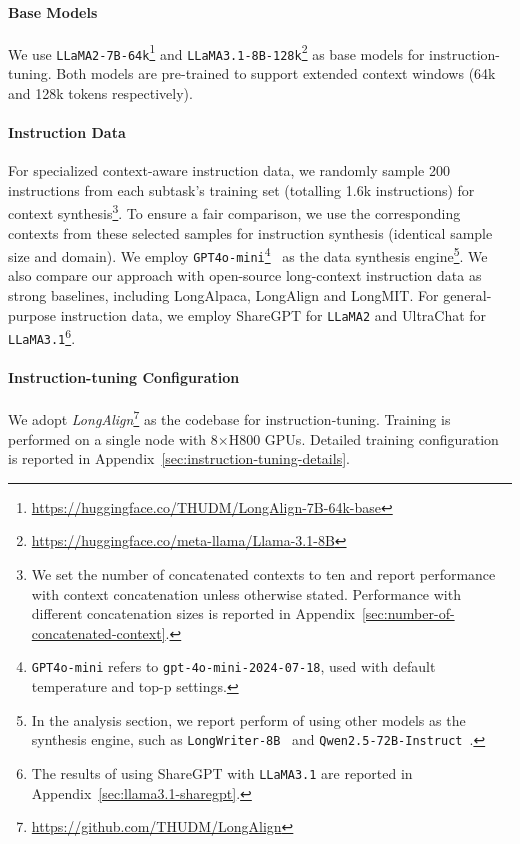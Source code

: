 \noindent\paragraph{Base Models}
We use \texttt{LLaMA2-7B-64k}\footnote{\url{https://huggingface.co/THUDM/LongAlign-7B-64k-base}}
and \texttt{LLaMA3.1-8B-128k}\footnote{\url{https://huggingface.co/meta-llama/Llama-3.1-8B}} as base models for instruction-tuning.
Both models are pre-trained to support extended context windows (64k and 128k tokens respectively).

\noindent\paragraph{Instruction Data}
For specialized context-aware instruction data, we randomly sample 200 instructions from each subtask's training set (totalling 1.6k instructions) for context synthesis\footnote{We set the number of concatenated contexts to ten and report performance with context concatenation unless otherwise stated. Performance with different concatenation sizes is reported in Appendix~\ref{sec:number-of-concatenated-context}.}.
To ensure a fair comparison, we use the corresponding contexts from these selected samples for instruction synthesis (identical sample size and domain).
We employ \texttt{GPT4o-mini}\footnote{\texttt{GPT4o-mini} refers to \texttt{gpt-4o-mini-2024-07-18}, used with default temperature and top-p settings.}~\cite{openai2024gpt4ocard} as the data synthesis engine\footnote{In the analysis section, we report perform of using other models as the synthesis engine, such as \texttt{LongWriter-8B}~\cite{bai2024longwriter} and \texttt{Qwen2.5-72B-Instruct}~\cite{qwen2025qwen25}.}.
We also compare our approach with open-source long-context instruction data as strong baselines, including LongAlpaca, LongAlign and LongMIT. 
For general-purpose instruction data, we employ ShareGPT for \texttt{LLaMA2} and UltraChat for \texttt{LLaMA3.1}\footnote{The results of using ShareGPT with \texttt{LLaMA3.1} are reported in Appendix~\ref{sec:llama3.1-sharegpt}.}.

\noindent\paragraph{Instruction-tuning Configuration}
We adopt \textit{LongAlign}\footnote{\url{https://github.com/THUDM/LongAlign}} as the codebase for instruction-tuning.
Training is performed on a single node with 8$\times$H800 GPUs.
Detailed training configuration is reported in Appendix~\ref{sec:instruction-tuning-details}.

